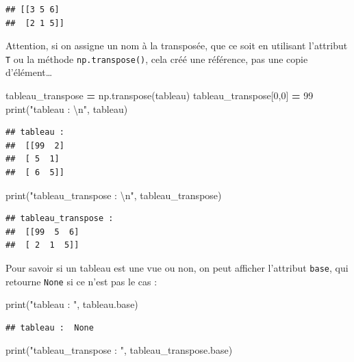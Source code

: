 \documentclass[12pt,]{book}
\newenvironment{Shaded}{\begin{snugshade}}{\end{snugshade}}
\newcommand{\DecValTok}[1]{\textcolor[rgb]{0.00,0.00,0.81}{#1}}
\newcommand{\CharTok}[1]{\textcolor[rgb]{0.31,0.60,0.02}{#1}}
\newcommand{\StringTok}[1]{\textcolor[rgb]{0.31,0.60,0.02}{#1}}
\newcommand{\OperatorTok}[1]{\textcolor[rgb]{0.81,0.36,0.00}{\textbf{#1}}}
\newcommand{\BuiltInTok}[1]{#1}
\newcommand{\NormalTok}[1]{#1}
\numberwithin{equation}{section}
\numberwithin{countremarque}{section}
\begin{document}
\begin{lstlisting}
## [[3 5 6]
##  [2 1 5]]
\end{lstlisting}

Attention, si on assigne un nom à la transposée, que ce soit en
utilisant l'attribut \texttt{T} ou la méthode \texttt{np.transpose()},
cela créé une référence, pas une copie d'élément\ldots{}

\begin{Shaded}
\begin{Highlighting}[]
\NormalTok{tableau_transpose }\OperatorTok{=}\NormalTok{ np.transpose(tableau)}
\NormalTok{tableau_transpose[}\DecValTok{0}\NormalTok{,}\DecValTok{0}\NormalTok{] }\OperatorTok{=} \DecValTok{99}
\BuiltInTok{print}\NormalTok{(}\StringTok{"tableau : }\CharTok{\textbackslash{}n}\StringTok{"}\NormalTok{, tableau)}
\end{Highlighting}
\end{Shaded}

\begin{lstlisting}
## tableau : 
##  [[99  2]
##  [ 5  1]
##  [ 6  5]]
\end{lstlisting}

\begin{Shaded}
\begin{Highlighting}[]
\BuiltInTok{print}\NormalTok{(}\StringTok{"tableau_transpose : }\CharTok{\textbackslash{}n}\StringTok{"}\NormalTok{, tableau_transpose)}
\end{Highlighting}
\end{Shaded}

\begin{lstlisting}
## tableau_transpose : 
##  [[99  5  6]
##  [ 2  1  5]]
\end{lstlisting}

Pour savoir si un tableau est une vue ou non, on peut afficher
l'attribut \texttt{base}, qui retourne \texttt{None} si ce n'est pas le
cas :

\begin{Shaded}
\begin{Highlighting}[]
\BuiltInTok{print}\NormalTok{(}\StringTok{"tableau : "}\NormalTok{, tableau.base)}
\end{Highlighting}
\end{Shaded}

\begin{lstlisting}
## tableau :  None
\end{lstlisting}

\begin{Shaded}
\begin{Highlighting}[]
\BuiltInTok{print}\NormalTok{(}\StringTok{"tableau_transpose : "}\NormalTok{, tableau_transpose.base)}
\end{Highlighting}
\end{Shaded}
\end{document}
